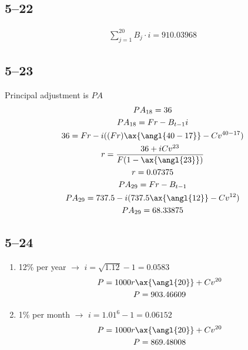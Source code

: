 \documentclass[a4paper, 12pt, reqno]{amsart}
\begin{document}
\subsection*{5--22}

\begin{equation}\nonumber
    \begin{gathered}
        \sum_{j=1}^{20} B_j \cdot i = 910.03968
    \end{gathered}
\end{equation}

\subsection*{5--23}

Principal adjustment is $PA$
\begin{equation}\nonumber
    \begin{gathered}
        PA_{18} = 36            \\
        PA_{18} = Fr - B_{t-1} i            \\
        36 = Fr - i ((Fr)\ax{\angl{40-17}} - C v^{40-17})            \\
        r = \frac{36 + i C v^{23}}{F(1 - \ax{\angl{23}})}           \\
        r = 0.07375                                         \\
        PA_{29} = Fr - B_{t-1} \\
        PA_{29} = 737.5 - i (737.5 \ax{\angl{12}} - C v^{12})\\
        PA_{29} = 68.33875
    \end{gathered}
\end{equation}

\subsection*{5--24}

\begin{enumerate}
    \item 12\% per year $\rightarrow$ $i = \sqrt{1.12} - 1 = 0.0583$
        \begin{equation}\nonumber
            \begin{gathered}
                P = 1000 r \ax{\angl{20}} + C v^{20} \\
                P = 903.46609
            \end{gathered}
        \end{equation}
    \item 1\% per month $\rightarrow$ $i = 1.01^6 - 1 = 0.06152$
        \begin{equation}\nonumber
            \begin{gathered}
                P = 1000 r \ax{\angl{20}} + C v^{20} \\
                P = 869.48008
            \end{gathered}
        \end{equation}
\end{enumerate}
\end{document}
